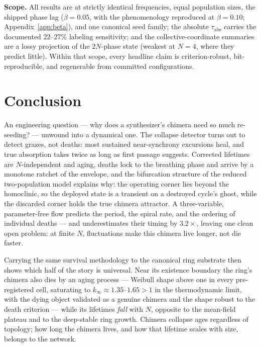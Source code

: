 \documentclass[pdflatex,sn-mathphys,Numbered]{sn-jnl}
\begin{document}
\textbf{Scope.} All results are at strictly identical frequencies, equal population
sizes, the shipped phase lag ($\beta = 0.05$, with the phenomenology reproduced at
$\beta = 0.10$; Appendix~\ref{app:beta}), and one canonical seed family; the absolute
$\tau_{\mathrm{abs}}$ carries the documented 22--27\% labeling sensitivity; and the
collective-coordinate summaries are a lossy projection of the $2N$-phase state
(weakest at $N = 4$, where they predict little). Within that scope, every headline
claim is criterion-robust, bit-reproducible, and regenerable from committed
configurations.

\section{Conclusion}\label{sec:conclusion}

An engineering question --- why does a synthesizer's chimera need so much
re-seeding? --- unwound into a dynamical one. The collapse detector turns out to
detect grazes, not deaths: most sustained near-synchrony excursions heal, and true
absorption takes twice as long as first passage suggests. Corrected lifetimes are
$N$-independent and aging, deaths lock to the breathing phase and arrive by a
monotone ratchet of the envelope, and the bifurcation structure of the reduced
two-population model explains why: the operating corner lies beyond the homoclinic,
so the deployed state is a transient on a destroyed cycle's ghost, while the
discarded corner holds the true chimera attractor. A three-variable, parameter-free
flow predicts the period, the spiral rate, and the ordering of individual deaths
--- and underestimates their timing by $3.2\times$, leaving one clean open problem:
at finite $N$, fluctuations make this chimera live longer, not die faster.

Carrying the same survival methodology to the canonical ring substrate then shows
which half of the story is universal. Near its existence boundary the ring's
chimera also dies by an aging process --- Weibull shape above one in every
pre-registered cell, saturating to $k_\infty \approx 1.35$--$1.65 > 1$ in the
thermodynamic limit, with the dying object validated as a genuine chimera and the
shape robust to the death criterion --- while its lifetimes \emph{fall} with $N$,
opposite to the mean-field plateau and to the deep-stable ring growth. Chimera
collapse ages regardless of topology; how long the chimera lives, and how that
lifetime scales with size, belongs to the network.
\end{document}
